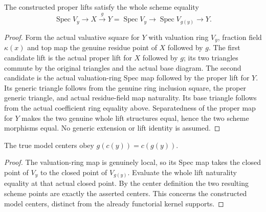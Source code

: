 \begin{theorem}
\label{scheme:proper-center-lift-naturality}
\leanok
{}
The constructed proper lifts satisfy the whole scheme equality
\[
 \operatorname{Spec}V_y\longrightarrow X\xrightarrow{g}Y
 =\operatorname{Spec}V_y\longrightarrow\operatorname{Spec}V_{g(y)}
   \longrightarrow Y.
\]
\end{theorem}
\begin{proof}
Form the actual valuative square for $Y$ with valuation ring $V_y$,
fraction field $\kappa(x)$ and top map the genuine residue point of $X$
followed by $g$. The first candidate lift is the actual proper lift for
$X$ followed by $g$; its two triangles commute by the original triangles
and the actual base diagram. The second candidate is the actual valuation-ring
Spec map followed by the proper lift for $Y$. Its generic triangle follows
from the genuine ring inclusion square, the proper generic triangle, and
actual residue-field map naturality. Its base triangle follows from the
actual coefficient ring equality above. Separatedness of the proper map
for $Y$ makes the two genuine whole lift structures equal, hence the two
scheme morphisms equal. No generic extension or lift identity is assumed.
\end{proof}

\begin{theorem}
\label{scheme:proper-center-map}
\leanok
{}
The true model centers obey $g(c(y))=c(g(y))$.
\end{theorem}
\begin{proof}
The valuation-ring map is genuinely local, so its Spec map takes the
closed point of $V_y$ to the closed point of $V_{g(y)}$. Evaluate the
whole lift naturality equality at that actual closed point. By the
center definition the two resulting scheme points are exactly the
asserted centers. This concerns the constructed model centers, distinct
from the already functorial kernel supports.
\end{proof}
